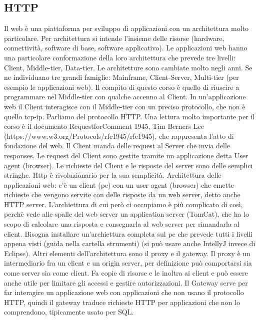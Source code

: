 \subsection{HTTP}
Il web è una piattaforma per sviluppo di applicazioni con un architettura molto particolare. Per architettura si intende l'insieme delle risorse (hardware, connettività, software di base, software applicativo).\newline
Le applicazioni web hanno una particolare conformazione della loro architettura che prevede tre livelli: Client, Middle-tier, Data-tier.\newline 
Le architetture sono  cambiate molto negli anni. Se ne individuano tre grandi famiglie: Mainframe, Client-Server, Multi-tier (per esempio le applicazioni web). \newline
Il compito di questo corso è quello di riuscire a programmare nel Middle-tier con qualche accenno al Client.\newline
In un'applicazione web il Client interagisce con il Middle-tier con un preciso protocollo, che non è quello tcp-ip. Parliamo del protocollo HTTP.\newline
Una lettura molto importante per il corso è il documento RequestforComment 1945, Tim Berners Lee (https://www.w3.org/Protocols/rfc1945/rfc1945), che rappresenta l'atto di fondazione del web.\newline
Il Client manda delle request al Server che invia delle responses. Le request del Client sono gestite tramite un applicazione detta User agent (browser).\newline
Le richieste del Client e le risposte del server sono delle semplici stringhe. Http è rivoluzionario per la sua semplicità.\newline
Architettura delle applicazioni web: c'è un client (pc) con un user agent (browser) che emette richieste che vengono servite con delle risposte da un web server, detto anche HTTP server. L'archiettura di cui però ci occupiamo è più complicato di così, perchè vede alle spalle del web server un application server (TomCat), che ha lo scopo di calcolare una risposta e consegnarla al web server per rimandarla al client.\newline
Bisogna installare un'archiettura completa sul pc che prevede tutti i livelli appena visti (guida nella cartella strumenti) (si può usare anche IntellyJ invece di Eclipse).\newline
Altri elementi dell'architettura sono il proxy e il gateway. Il proxy è un intermediario fra un client e un origin server, per definizione può comportarsi sia come server sia come client. Fa copie di risorse e le inoltra ai client e può essere anche utile per limitare gli accessi e gestire autorizzazioni. Il Gateway serve per far interagire un applicazione web con applicazioni che non usano il protocollo HTTP, quindi il gateway traduce richieste HTTP per applicazioni che non lo comprendono, tipicamente usato per SQL.\newline
